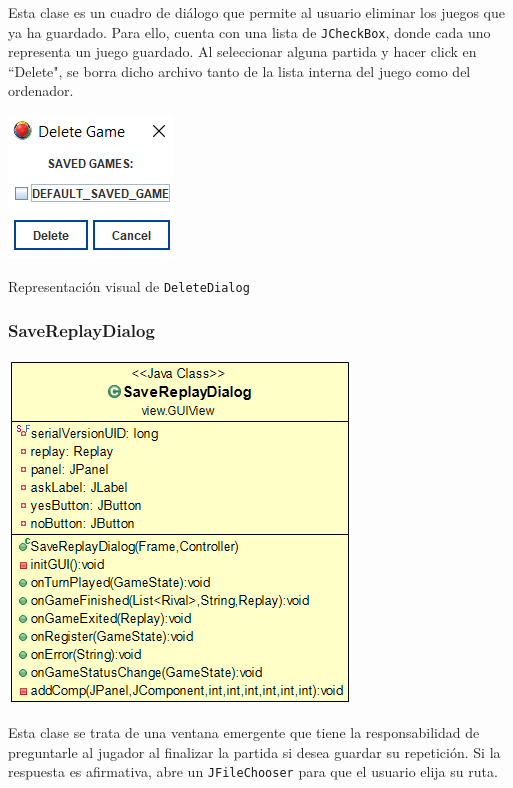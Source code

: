 \documentclass[../DocumentoOficial.tex]{subfiles}
\begin{document}
Esta clase es un cuadro de diálogo que permite al usuario eliminar los juegos que ya ha guardado. Para ello, cuenta con una lista de \texttt{JCheckBox}, donde cada uno representa un juego guardado. Al seleccionar alguna partida y hacer click en ``Delete", se borra dicho archivo tanto de la lista interna del juego como del ordenador.

\begin{center}
\includegraphics[scale=1]{delete-dialog-sprint6.png}

Representación visual de \texttt{DeleteDialog}

\end{center}

\newpage

\subsubsection{SaveReplayDialog}
\begin{center}
\includegraphics[scale=0.6]{savereplaydialo.png}
\end{center}

Esta clase se trata de una ventana emergente que tiene la responsabilidad de preguntarle al jugador al finalizar la partida si desea guardar su repetición. Si la respuesta es afirmativa, abre un \texttt{JFileChooser} para que el usuario elija su ruta.
\end{document}
